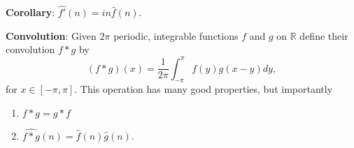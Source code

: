 \documentclass[12pt]{article}
\begin{document}
\noindent \textbf{Corollary}: $\hat{f'}(n) = in \hat{f}(n)$. 

\noindent \textbf{Convolution}: Given $2\pi$ periodic, integrable functions $f$ and $g$ on $\mathbb{R}$ define their convolution $f * g$ by $$(f*g)(x) = \frac{1}{2\pi} \int_{-\pi}^{\pi}f(y)g(x-y)dy,$$ for $x\in[-\pi, \pi]$.
This operation has many good properties, but importantly
\begin{enumerate}[itemsep=0pt, parsep=0pt, partopsep=0pt, topsep=0pt]
\item $f*g =g*f$ 
\item $\widehat{f*g}(n) = \hat{f}(n)\hat{g}(n)$. 
\end{enumerate}
\end{document}
